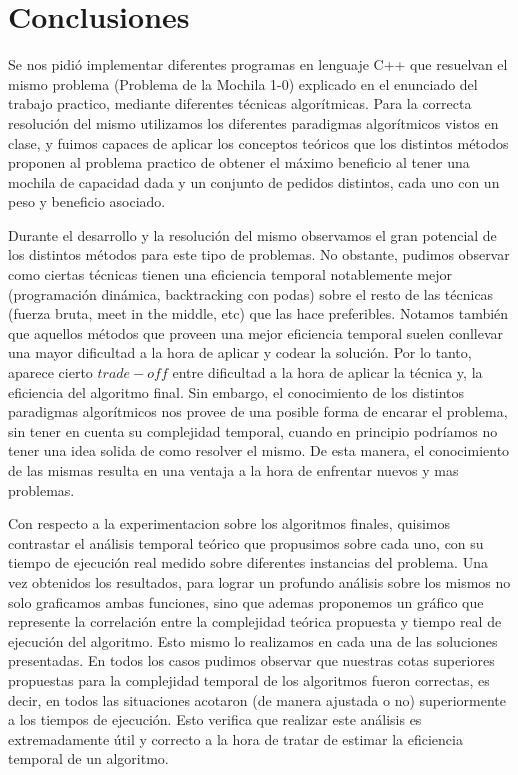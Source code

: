 \section{Conclusiones}
\label{sec:conclusiones}

Se nos pidió implementar diferentes programas en lenguaje C++ que resuelvan el mismo problema (Problema de la Mochila 1-0) explicado en el enunciado del trabajo practico, mediante diferentes técnicas algorítmicas.
Para la correcta resolución del mismo utilizamos los diferentes paradigmas algorítmicos vistos en clase, y fuimos capaces de aplicar los conceptos teóricos que los distintos métodos proponen al problema practico de obtener el máximo beneficio al tener una mochila de capacidad dada y un conjunto de pedidos distintos, cada uno con un peso y beneficio asociado.


Durante el desarrollo y la resolución del mismo observamos el gran potencial de los distintos métodos para este tipo de problemas. No obstante, pudimos observar como ciertas técnicas tienen una eficiencia temporal notablemente mejor (programación dinámica, backtracking con podas) sobre el resto de las técnicas (fuerza bruta, meet in the middle, etc) que las hace preferibles. Notamos también que aquellos métodos que proveen una mejor eficiencia temporal suelen conllevar una mayor dificultad a la hora de aplicar y codear la solución. Por lo tanto, aparece cierto $trade-off$ entre dificultad a la hora de aplicar la técnica y, la eficiencia del algoritmo final.
Sin embargo, el conocimiento de los distintos paradigmas algorítmicos nos provee de una posible forma de encarar el problema, sin tener en cuenta su complejidad temporal, cuando en principio podríamos no tener una idea solida de como resolver el mismo. De esta manera, el conocimiento de las mismas resulta en una ventaja a la hora de enfrentar nuevos y mas problemas.


Con respecto a la experimentacion sobre los algoritmos finales, quisimos contrastar el análisis temporal teórico que propusimos sobre cada uno, con su tiempo de ejecución real medido sobre diferentes instancias del problema.
Una vez obtenidos los resultados, para lograr un profundo análisis sobre los mismos no solo graficamos ambas funciones, sino que ademas proponemos un gráfico que represente la correlación entre la complejidad teórica propuesta y tiempo real de ejecución del algoritmo. Esto mismo lo realizamos en cada una de las soluciones presentadas.
En todos los casos pudimos observar que nuestras cotas superiores propuestas para la complejidad temporal de los algoritmos fueron correctas, es decir, en todos las situaciones acotaron (de manera ajustada o no) superiormente a los tiempos de ejecución. Esto verifica que realizar este análisis es extremadamente útil y correcto a la hora de tratar de estimar la eficiencia temporal de un algoritmo.


